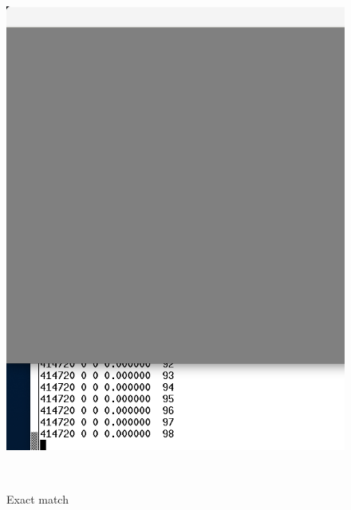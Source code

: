 \begin{figure}[h]
  \begin{minipage}[t]{0.49\textwidth}
    \strut\\[-1em]
    \includegraphics[width=\linewidth]{ydiff_same.png}
    \caption{Exact match}
  \end{minipage}
  \hfill
  \begin{minipage}[t]{0.49\textwidth}
    \strut\\[-1em]

\end{minipage}
\end{figure}
